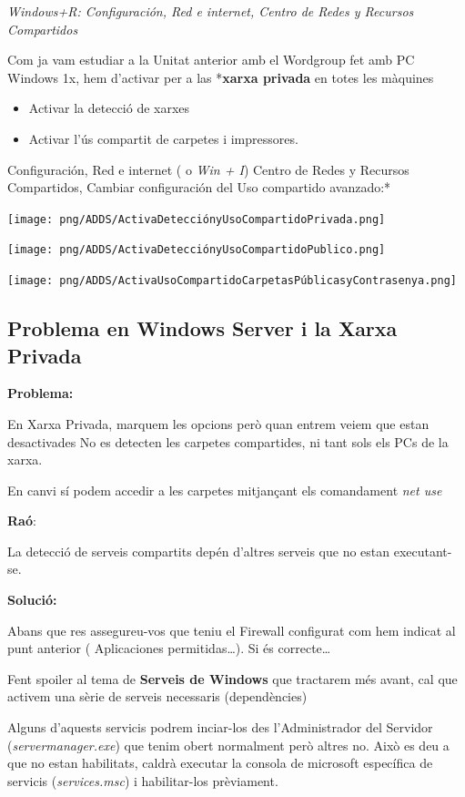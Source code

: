 \documentclass[
  a4paper,
]{article}
\begin{document}
\emph{Windows+R: Configuración, Red e internet, Centro de Redes y
Recursos Compartidos}

Com ja vam estudiar a la Unitat anterior amb el Wordgroup fet amb PC
Windows 1x, hem d'activar per a las *\textbf{xarxa privada} en totes les
màquines

\begin{itemize}
\item
  Activar la detecció de xarxes
\item
  Activar l'ús compartit de carpetes i impressores.
\end{itemize}

Configuración, Red e internet ( o \emph{Win + I}) Centro de Redes y
Recursos Compartidos, Cambiar configuración del Uso compartido
avanzado:*

\texttt{[image: png/ADDS/ActivaDetecciónyUsoCompartidoPrivada.png]}

\texttt{[image: png/ADDS/ActivaDetecciónyUsoCompartidoPublico.png]}

\texttt{[image: png/ADDS/ActivaUsoCompartidoCarpetasPúblicasyContrasenya.png]}

\subsection{Problema en Windows Server i la Xarxa
Privada}\label{problema-en-windows-server-i-la-xarxa-privada}

\textbf{Problema:}

En Xarxa Privada, marquem les opcions però quan entrem veiem que estan
desactivades No es detecten les carpetes compartides, ni tant sols els
PCs de la xarxa.

En canvi sí podem accedir a les carpetes mitjançant els comandament
\emph{net use}

\textbf{Raó}:

La detecció de serveis compartits depén d'altres serveis que no estan
executant-se.

\textbf{Solució:}

Abans que res assegureu-vos que teniu el Firewall configurat com hem
indicat al punt anterior ( Aplicaciones permitidas\ldots). Si és
correcte\ldots{}

Fent spoiler al tema de \textbf{Serveis de Windows} que tractarem més
avant, cal que activem una sèrie de serveis necessaris (dependències)

Alguns d'aquests servicis podrem inciar-los des l'Administrador del
Servidor (\emph{servermanager.exe}) que tenim obert normalment però
altres no. Això es deu a que no estan habilitats, caldrà executar la
consola de microsoft específica de servicis (\emph{services.msc}) i
habilitar-los prèviament.
\end{document}
